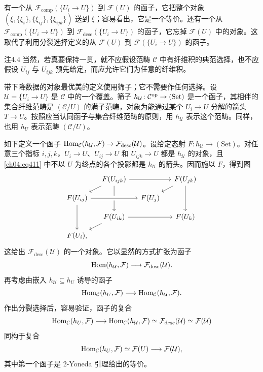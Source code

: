 有一个从 $\mathcal F_{\mathrm{comp}}(\{U_i\to U\})$ 到 $\mathcal F(U)$ 的函子，它把整个对象 $(\xi,\allowbreak\{\xi_i\},\allowbreak\{\xi_{ij}\},\allowbreak\{\xi_{ijk}\})$ 送到 $\xi$；容易看出，它是一个等价。还有一个从 $\mathcal F_{\mathrm{comp}}(\{U_i\to U\})$ 到 $\mathcal F_{\mathrm{desc}}(\{U_i\to U\})$ 的函子，它忘掉 $\mathcal F(U)$ 中的对象。这取代了利用分裂选择定义的从 $\mathcal F(U)$ 到 $\mathcal F(\{U_i\to U\})$ 的函子。

\begin{origstatement}{注}{4.4}\label{ch04:rem44}
当然，若真要保持一贯，就不应假设范畴 $\mathcal C$ 中有纤维积的典范选择，也不应假设 $U_{ij}$ 与 $U_{ijk}$ 预先给定，而应允许它们为任意的纤维积。
\end{origstatement}

带下降数据的对象最优美的定义使用筛子；它不需要作任何选择。设 $\mathcal U=\{U_i\to U\}$ 是 $\mathcal C$ 中的一个覆盖。筛子 $h_{\mathcal U}\colon\mathcal C^{\mathrm{op}}\to(\mathrm{Set})$ 是一个函子，其相伴的集合纤维范畴是 $(\mathcal C/U)$ 的满子范畴，对象为能通过某个 $U_i\to U$ 分解的箭头 $T\to U$。按照应当认同函子与集合纤维范畴的原则，用 $h_{\mathcal U}$ 表示这个范畴。同样，也用 $h_U$ 表示范畴 $(\mathcal C/U)$。

如下定义一个函子 $\operatorname{Hom}_{\mathcal C}(h_{\mathcal U},\mathcal F)\to\mathcal F_{\mathrm{desc}}(\mathcal U)$。设给定态射 $F\colon h_{\mathcal U}\to(\mathrm{Set})$。对任意三个指标 $i,j,k$，$U_i\to U$、$U_{ij}\to U$ 和 $U_{ijk}\to U$ 都是 $h_{\mathcal U}$ 的对象，且 \eqref{ch04:eq411} 中不以 $U$ 为终点的各个投影都是 $h_{\mathcal U}$ 的箭头。因而施以 $F$，得到图
\[
\begin{tikzcd}[row sep=.9em,column sep=1.2em]
 &F(U_{ijk})\arrow[rr]\arrow[dl]\arrow[dd]&&F(U_{jk})\arrow[dl]\arrow[dd]\\
 F(U_{ij})\arrow[rr,crossing over]\arrow[dd]&&F(U_j)\\
 &F(U_{ik})\arrow[rr]\arrow[dl]&&F(U_k)\\
 F(U_i),
\end{tikzcd}
\]
这给出 $\mathcal F_{\mathrm{desc}}(\mathcal U)$ 的一个对象。它以显然的方式扩张为函子
\[
 \operatorname{Hom}(h_{\mathcal U},\mathcal F)\longrightarrow\mathcal F_{\mathrm{desc}}(\mathcal U).
\]
再考虑由嵌入 $h_{\mathcal U}\subseteq h_U$ 诱导的函子
\[
 \operatorname{Hom}_{\mathcal C}(h_U,\mathcal F)\longrightarrow\operatorname{Hom}_{\mathcal C}(h_{\mathcal U},\mathcal F).
\]
作出分裂选择后，容易验证，函子的复合
\[
 \operatorname{Hom}_{\mathcal C}(h_U,\mathcal F)\longrightarrow
 \operatorname{Hom}_{\mathcal C}(h_{\mathcal U},\mathcal F)
 \simeq\mathcal F_{\mathrm{desc}}(\mathcal U)\simeq\mathcal F(\mathcal U)
\]
同构于复合
\[
 \operatorname{Hom}_{\mathcal C}(h_U,\mathcal F)\simeq\mathcal F(U)\longrightarrow\mathcal F(\mathcal U),
\]
其中第一个函子是 2-Yoneda 引理给出的等价。

